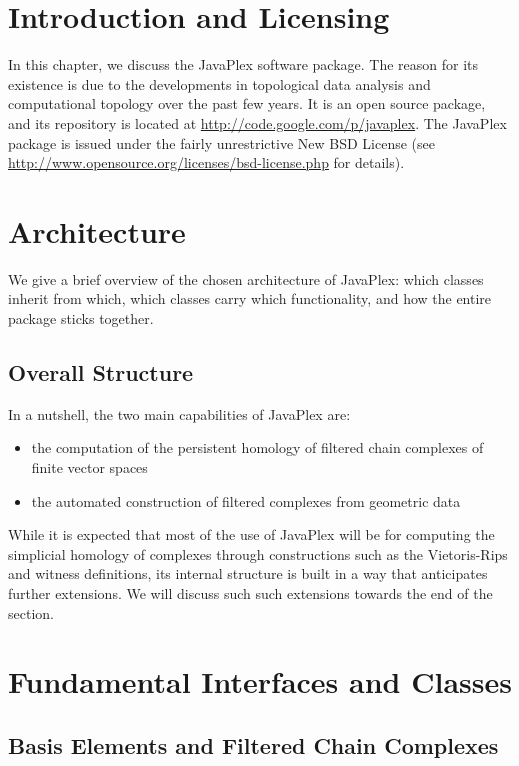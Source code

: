 \section{Introduction and Licensing}

In this chapter, we discuss the JavaPlex software package. The reason for its existence is due to the developments in topological data analysis and computational topology over the past few years. It is an open source package, and its repository is located at \url{http://code.google.com/p/javaplex}. The JavaPlex package is issued under the fairly unrestrictive New BSD License (see \url{http://www.opensource.org/licenses/bsd-license.php} for details). 

\section{Architecture}

We give a brief overview of the chosen architecture of JavaPlex: which classes inherit from which, which classes carry which functionality, and how the entire package sticks together.

\subsection{Overall Structure}

In a nutshell, the two main capabilities of JavaPlex are:
\begin{itemize}
\item the computation of the persistent homology of filtered chain complexes of finite vector spaces
\item the automated construction of filtered complexes from geometric data 
\end{itemize}


While it is expected that most of the use of JavaPlex will be for computing the simplicial homology of complexes through constructions such as the Vietoris-Rips and witness definitions, its internal structure is built in a way that anticipates further extensions. We will discuss such such extensions towards the end of the section.

\section{Fundamental Interfaces and Classes}
\subsection{Basis Elements and Filtered Chain Complexes}

